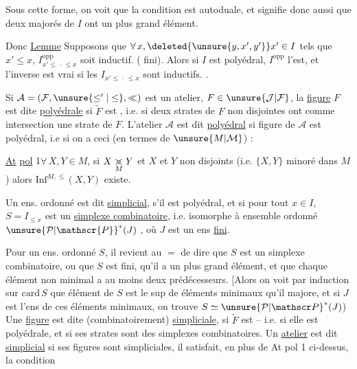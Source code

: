 Sous cette forme, on voit que la condition est autoduale, et signifie donc aussi que deux  majorés de $I$ ont un plus grand élément.

Donc \uline{Lemme} Supposons que $\forall\,x,\deleted{\unsure{y,x',y'}}x'\in I$ tels que $x'\leq x$, $I^{\mathrm{opp}}_{x'\leq\,\cdot\,\leq x}$ soit inductif.  ( fini). Alors si $I$ est polyédral, $I^{\mathrm{opp}}$ l'est, et l'inverse est vrai si les $I_{x'\leq\,\cdot\,\leq x}$ sont inductifs. .

Si  $\mathcal{A}=(\mathcal{F},\unsure{\leq^{\prime}|\leq},\ll)$ est un atelier, $F\in\unsure{\mathcal{J}|\mathcal{F}}$, la \uline{figure} \uline{} $F$ est dite \uline{polyédrale} si $\widetilde{F}$ est , i.e. si deux strates de $F$ non disjointes ont comme intersection une strate de $F$. L'atelier $\mathcal A$ est dit \uline{polyédral} si  figure de $\mathcal A$ est polyédral, i.e si on a ceci (en termes de $\unsure{M|\mathcal{M}}$) :

\uline{At} \uline{pol} 1\quad $\forall\,X,Y\in M$, si $X\underset{M}{\mathrel{>\mkern-12mu<}}Y$ et $X$ et $Y$ non disjoints (i.e. $\{X,Y\}$ minoré dans $M$) alors  $\mathrm{Inf}^{M,\leq}(X,Y)$ existe.

Un ens. ordonné  est dit \uline{simplicial}, s'il est polyédral, et si pour tout $x\in I$, $S=I_{\leq x}$ est un \uline{simplexe combinatoire}, i.e. isomorphe à  ensemble ordonné ${\unsure{\mathcal{P}|\mathscr{P}}}^*(J)$ , où $J$ est un ens \uline{fini}.

Pour un ens. ordonné $S$, il revient au $=$ de dire que $S$ est un simplexe combinatoire, ou que $S$ est  fini, qu'il a un plus grand élément, et que chaque élément non minimal a au moins deux prédécesseurs. [Alors on voit par induction sur $\mathrm{card}\,S$ que  élément de $S$ est
le sup de  éléments minimaux qu'il majore, et si $J$ est l'ens de ces éléments minimaux, on trouve $S\simeq{\unsure{\mathcal{P}|\mathscr P}}^{*}(J)$)
Une \uline{figure}  est dite (combinatoirement) \uline{simpliciale}, si $\widetilde F$ est  -- i.e. si elle est polyédrale, et si ses strates sont des simplexes combinatoires. Un \uline{atelier} est dit  \uline{simplicial} si  ses figures sont simpliciales,  il satisfait, en plus de At pol 1 ci-dessus, la condition

